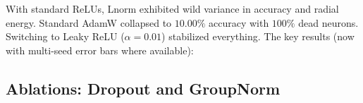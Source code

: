 \documentclass[11pt,a4paper]{article}
\begin{document}
With standard ReLUs, Lnorm exhibited wild variance in accuracy and radial energy. Standard AdamW collapsed to $10.00\%$ accuracy with $100\%$ dead neurons. Switching to Leaky ReLU ($\alpha=0.01$) stabilized everything. The key results (now with multi-seed error bars where available):

\begin{table}[ht]
\centering
\caption{Split CIFAR-100 Task-10 plasticity metrics. Leaky ReLU ($\alpha = 0.01$).}
\label{tab:sarthak_main}
\end{table}

\subsection{Ablations: Dropout and GroupNorm}

\begin{table}[ht]
\centering
\caption{Ablation: Dropout and GroupNorm interactions with Lnorm.}
\label{tab:sarthak_ablation}
\end{table}
\end{document}
